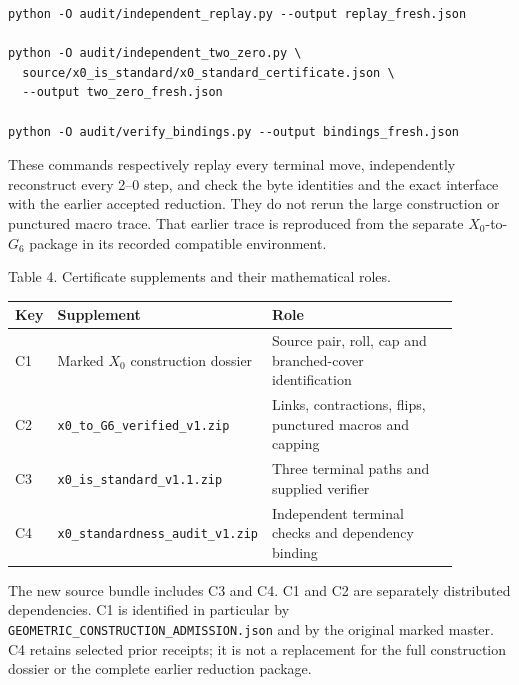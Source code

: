 \documentclass[11pt,letterpaper]{article}
\begin{document}
\begin{Verbatim}
python -O audit/independent_replay.py --output replay_fresh.json

python -O audit/independent_two_zero.py \
  source/x0_is_standard/x0_standard_certificate.json \
  --output two_zero_fresh.json

python -O audit/verify_bindings.py --output bindings_fresh.json
\end{Verbatim}
These commands respectively replay every terminal move, independently reconstruct every 2--0 step, and check the byte identities and the exact interface with the earlier accepted reduction. They do not rerun the large construction or punctured macro trace. That earlier trace is reproduced from the separate $X_0$-to-$G_6$ package in its recorded compatible environment.

\noindent\begin{minipage}{\linewidth}
\begin{center}\small
Table 4. Certificate supplements and their mathematical roles.\par\smallskip
\begin{tabular}{p{0.07\linewidth}p{0.36\linewidth}p{0.45\linewidth}}
\toprule
\textbf{Key} & \textbf{Supplement} & \textbf{Role} \\
\midrule
C1 & Marked $X_0$ construction dossier & Source pair, roll, cap and branched-cover identification \\
C2 & {\small\texttt{x0\_to\_G6\_verified\_v1.zip}} & Links, contractions, flips, punctured macros and capping \\
C3 & {\small\texttt{x0\_is\_standard\_v1.1.zip}} & Three terminal paths and supplied verifier \\
C4 & {\small\texttt{x0\_standardness\_audit\_v1.zip}} & Independent terminal checks and dependency binding \\
\bottomrule
\end{tabular}
\end{center}
\end{minipage}\par\smallskip
The new source bundle includes C3 and C4. C1 and C2 are separately distributed dependencies. C1 is identified in particular by {\small\texttt{GEOMETRIC\_CONSTRUCTION\_ADMISSION.json}} and by the original marked master. C4 retains selected prior receipts; it is not a replacement for the full construction dossier or the complete earlier reduction package.
\end{document}
